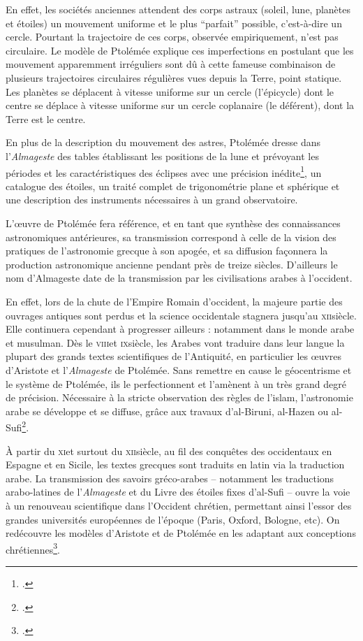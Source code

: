 En effet, les sociétés anciennes attendent des
corps astraux (soleil, lune, planètes et étoiles) un mouvement uniforme
et le plus ``parfait'' possible, c'est-à-dire un cercle. Pourtant la
trajectoire de ces corps, observée empiriquement, n'est pas circulaire.
Le modèle de Ptolémée explique ces imperfections en postulant que les
mouvement apparemment irréguliers sont dû à cette fameuse combinaison de
plusieurs trajectoires circulaires régulières vues depuis la Terre,
point statique. Les planètes se déplacent à vitesse uniforme sur un
cercle (l'épicycle) dont le centre se déplace à vitesse uniforme sur un
cercle coplanaire (le déférent), dont la Terre est le centre.

En plus de la description du mouvement des astres, Ptolémée dresse dans
l'\emph{Almageste} des tables établissant les positions de la lune et
prévoyant les périodes et les caractéristiques des éclipses avec une
précision inédite\footcite{raymond_jones_ptolemy_2024}, un catalogue des étoiles, un traité
complet de trigonométrie plane et sphérique et une description des
instruments nécessaires à un grand observatoire.

L'œuvre de Ptolémée fera référence, et en tant que synthèse des
connaissances astronomiques antérieures, sa transmission correspond
à celle de la vision des pratiques de l'astronomie grecque à son apogée,
et sa diffusion façonnera la production astronomique ancienne pendant
près de treize siècles. D'ailleurs le nom d'Almageste date de la
transmission par les civilisations arabes à l'occident.

En effet, lors de la chute de l'Empire Romain d'occident, la majeure
partie des ouvrages antiques sont perdus et la science occidentale
stagnera jusqu'au \textsc{xii}\ieme siècle. Elle continuera cependant à progresser
ailleurs : notamment dans le monde arabe et musulman. Dès le \textsc{viii}\ieme et
\textsc{ix}\ieme siècle, les Arabes vont traduire dans leur langue la plupart des
grands textes scientifiques de l'Antiquité, en particulier les œuvres
d'Aristote et l'\emph{Almageste} de Ptolémée. Sans remettre en cause le
géocentrisme et le système de Ptolémée, ils le perfectionnent et
l'amènent à un très grand degré de précision. Nécessaire à la stricte
observation des règles de l'islam, l'astronomie arabe se développe et se
diffuse, grâce aux travaux d'al-Biruni, al-Hazen ou al-Sufi\footcite{noauthor_monde_nodate}.

À partir du \textsc{xi}\ieme et surtout du \textsc{xii}\ieme siècle, au fil des conquêtes des
occidentaux en Espagne et en Sicile, les textes grecques sont traduits
en latin via la traduction arabe. La transmission des savoirs
gréco-arabes -- notamment les traductions arabo-latines de
l'\emph{Almageste} et du Livre des étoiles fixes d'al-Sufi -- ouvre la
voie à un renouveau scientifique dans l'Occident chrétien, permettant
ainsi l'essor des grandes universités européennes de l'époque (Paris,
Oxford, Bologne, etc). On redécouvre les modèles d'Aristote et de
Ptolémée en les adaptant aux conceptions chrétiennes\footcite[``Le
  système géocentrique devient le modèle astronomique et théologique de
  l'Église, qui ne remet pas en cause la sphéricité de la Terre''][]{noauthor_monde_nodate}.

